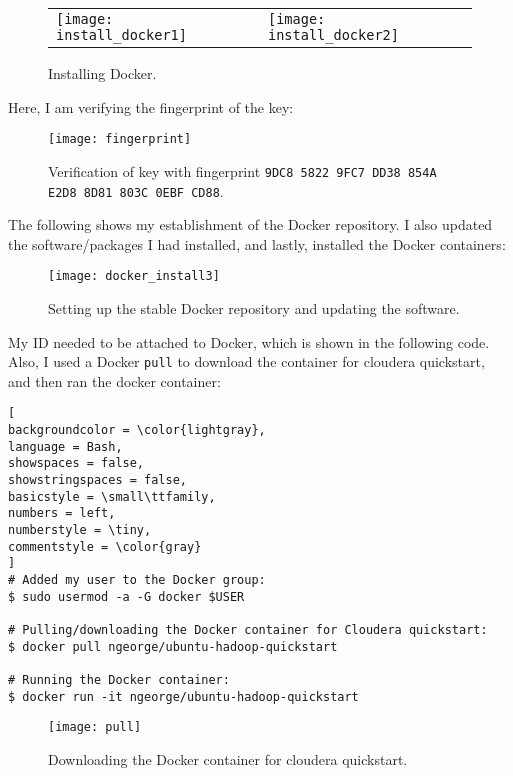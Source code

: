 \documentclass[]{article}
\newcommand{\code}[1]{\colorbox{light-gray}{\texttt{#1}}}
\begin{document}
\begin{figure}[!h]
	\begin{tabular}{ll}
		\texttt{[image: install\_docker1]}
		&
		\texttt{[image: install\_docker2]}
	\end{tabular}
	\caption{Installing Docker.}
	\label{Fig:Race}
\end{figure}
Here, I am verifying the fingerprint of the key:

\begin{figure}[!h]
	\texttt{[image: fingerprint]}
	\caption{Verification of key with fingerprint \code{9DC8 5822 9FC7 DD38 854A E2D8 8D81 803C 0EBF CD88}.}
	\label{Fig:Race}
\end{figure}
The following shows my establishment of the Docker repository.  I also updated the software/packages I had installed, and lastly, installed the Docker containers:

\begin{figure}[!h]
	\texttt{[image: docker\_install3]}
	\caption{Setting up the stable Docker repository and updating the software.}
	\label{Fig:Race}
\end{figure}

My ID needed to be attached to Docker, which is shown in the following code.  Also, I used a Docker \code{pull} to download the container for cloudera quickstart, and then ran the docker container:

\begin{lstlisting}[
backgroundcolor = \color{lightgray},
language = Bash,
showspaces = false,
showstringspaces = false,
basicstyle = \small\ttfamily,
numbers = left,
numberstyle = \tiny,
commentstyle = \color{gray}
]
# Added my user to the Docker group:
$ sudo usermod -a -G docker $USER

# Pulling/downloading the Docker container for Cloudera quickstart:
$ docker pull ngeorge/ubuntu-hadoop-quickstart

# Running the Docker container:
$ docker run -it ngeorge/ubuntu-hadoop-quickstart
\end{lstlisting}
\begin{figure}[!h]
	\texttt{[image: pull]}
	\caption{Downloading the Docker container for cloudera quickstart.}
	\label{Fig:Race}
\end{figure}
\end{document}
